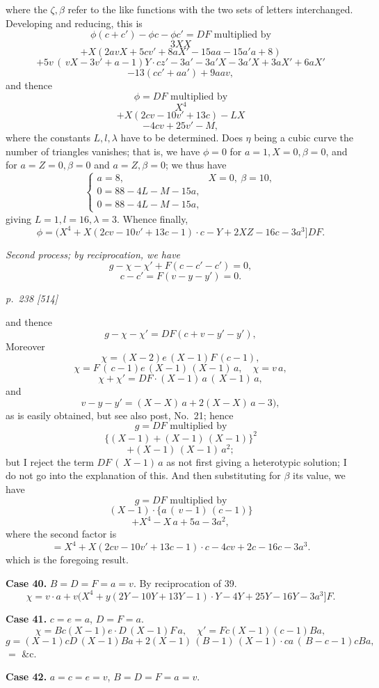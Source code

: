 \documentclass[11pt,a4paper]{book}
\begin{document}
where the $\zeta, \beta$ refer to the like functions with the two sets of letters interchanged.
Developing and reducing, this is
\[
\phi(c+c')-\phi c-\phi c'=DF \text{ multiplied by}
\]
\[
3XX
\]
\[
+X(2avX+5cv'+8aX'-15aa-15a'a+8)
\]
\[
+5v\,(\,vX-3v'+a-1)Y\cdot cz'-3a'-3a'X-3a'X+3aX'+6aX'
\]
\[
-13(cc'+aa')+9aav,
\]
and thence
\[
\phi=DF\text{ multiplied by}
\]
\[
X^4
\]
\[
+X(2cv-10v'+13c)-LX
\]
\[
-4cv+25v'-M,
\]
where the constants $L, l, \lambda$ have to be determined.  Does $\eta$ being a cubic curve the
number of triangles vanishes; that is, we have $\phi=0$ for $a=1, X=0, \beta=0$, and for
$a=Z=0, \beta=0$ and $a=Z, \beta=0$; we thus have
\[
\begin{cases}
a=8, & X=0, \ \beta=10, \\
0=88-4L-M-15a, \\
0=88-4L-M-15a,
\end{cases}
\]
giving $L=1, l=16, \lambda=3$.  Whence finally,
\[
\phi=(X^4+X(2cv-10v'+13c-1)\cdot c-Y+2XZ-16c-3a^3]DF.
\]

\textit{Second process; by reciprocation, we have}
\[
g-\chi-\chi'+F(c-c'-c')=0,
\]
\[
c-c'=F(v-y-y')=0.
\]

\clearpage

\bigskip
\textit{p.~238 [514]}
\smallskip

and thence
\[
g-\chi-\chi'=DF(c+v-y'-y'),
\]
Moreover
\[
\chi=(X-2)e\,(X-1)F\,(c-1),
\]
\[
\chi=F\,(\,c-1)e\,(X-1)\,(X-1)\,a, \quad \chi=v\,a,
\]
\[
\chi+\chi'=DF\cdot (X-1)\,a\,(\,X-1)\,a,
\]
and
\[
v-y-y'=(X-X)\,a+2(X-X)\,a-3),
\]
as is easily obtained, but see also post, No.\ 21; hence
\[
g=DF\text{ multiplied by}
\]
\[
\{(X-1)+(X-1)\,(X-1)\}^2
\]
\[
+(X-1)\,(X-1)\,a^2;
\]
but I reject the term $DF\,(\,X-1)\,a$ as not first giving a heterotypic solution; I do
not go into the explanation of this.  And then substituting for $\beta$ its value, we have
\[
g=DF\text{ multiplied by}
\]
\[
(X-1)\cdot \{a\,(\,v-1)\,(c-1)\}
\]
\[
+X^4-X\,a+5a-3a^2,
\]
where the second factor is
\[
=X^4+X(2cv-10v'+13c-1)\cdot c-4cv+2c-16c-3a^3.
\]
which is the foregoing result.

\textbf{Case 40.}  $B=D=F=a=v$.  By reciprocation of 39.
\[
\chi=v\cdot a+v(X^4+y(2Y-10Y+13Y-1)\cdot Y-4Y+25Y-16Y-3a^3]F.
\]

\textbf{Case 41.}  $c=e=a$, $D=F=a$.
\[
\chi=Bc(X-1)e\cdot D\,(X-1)F\,a, \quad \chi'=Fc(X-1)(c-1)Ba,
\]
\[
g=(X-1)cD\,(X-1)Ba+2(X-1)\,(B-1)\,(X-1)\cdot ca\,(\,B-c-1)cBa,
\]
$=$ \&c.

\textbf{Case 42.}  $a=c=e=v$, $B=D=F=a=v$.
\end{document}
